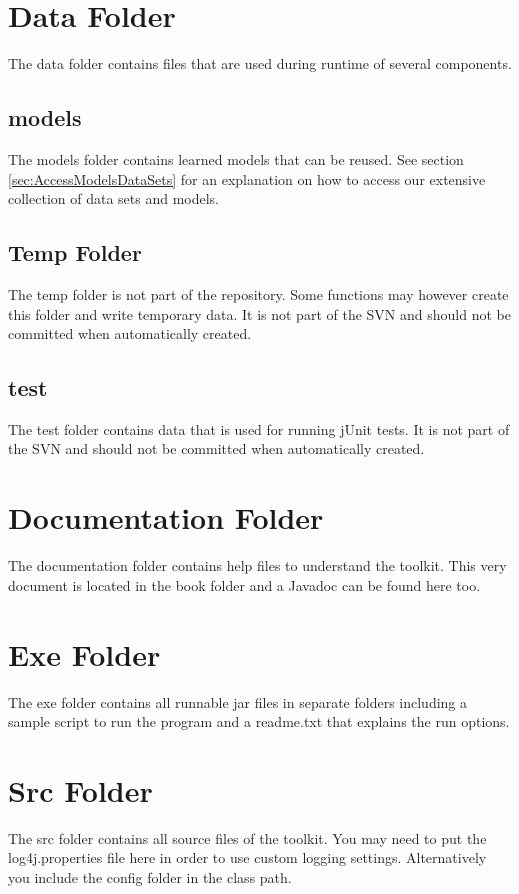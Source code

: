 \section{Data Folder}
The data folder contains files that are used during runtime of several components.

\subsection{models}
The models folder contains learned models that can be reused. See section \ref{sec:AccessModelsDataSets} for an explanation on how to access our extensive collection of data sets and models.

\subsection{Temp Folder}
The temp folder is not part of the repository. Some functions may however create this folder and write temporary data. It is not part of the SVN and should not be committed when automatically created.

\subsection{test}  
The test folder contains data that is used for running jUnit tests. It is not part of the SVN and should not be committed when automatically created.

\section{Documentation Folder}
The documentation folder contains help files to understand the toolkit. This very document is located in the book folder and a Javadoc can be found here too.

\section{Exe Folder}
The exe folder contains all runnable jar files in separate folders including a sample script to run the program and a readme.txt that explains the run options.

\section{Src Folder}
The src folder contains all source files of the toolkit. You may need to put the log4j.properties file here in order to use custom logging settings. Alternatively you include the config folder in the class path.
